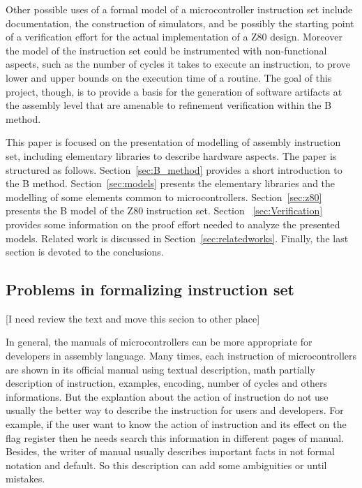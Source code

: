 \documentclass[11pt]{article} %
\begin{document}
Other possible uses of a formal model of a microcontroller
instruction set include documentation, the construction of simulators,
and be possibly the starting point of a verification effort for the
actual implementation of a Z80 design. Moreover the model of the
instruction set could be instrumented with non-functional aspects,
such as the number of cycles it takes to execute an instruction, to
prove lower and upper bounds on the execution time of a routine. The
goal of this project, though, is to provide a basis for the generation
of software artifacts at the assembly level that are amenable to 
refinement verification within the B method.

This paper is focused on the presentation of modelling of assembly instruction
set, including elementary libraries to describe hardware aspects. The paper is
structured as follows. Section~\ref{sec:B_method} provides a short introduction
to the B method. Section~\ref{sec:models} presents the elementary libraries and
the modelling of some elements common to microcontrollers.  Section~\ref{sec:z80}
presents the B model of the Z80 instruction set. Section ~\ref{sec:Verification}
provides some information on the proof effort needed to analyze the presented
models. Related work is discussed in Section~\ref{sec:relatedworks}. Finally, the
last section is devoted to the conclusions.

\subsection{Problems in formalizing instruction set}
[I need review the text and move this secion to other place]

In general, the manuals of microcontrollers can be more appropriate for
developers in assembly language. Many times, each instruction of microcontrollers
are shown in its official manual using textual description, math partially
description of instruction, examples, encoding, number of cycles and others
informations. But the explantion about the action of instruction do not use
usually the better way to describe the instruction for users and developers. For example,
if the user want to know the action of instruction and its effect on the flag
register then he needs search this information in different pages of manual.
Besides, the writer of manual usually describes important facts in not formal
notation and default. So this description can add some ambiguities or until
mistakes. 
\end{document}
